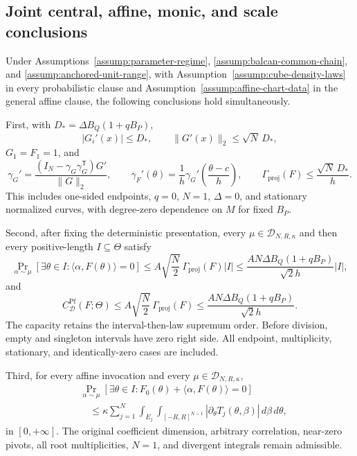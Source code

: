 \subsection{Joint central, affine, monic, and scale conclusions}
\label{app:full-conjunction}

\begin{proposition}
\label{prop:full-conjunction}
Under Assumptions~\ref{assump:parameter-regime},
\ref{assump:balcan-common-chain}, and
\ref{assump:anchored-unit-range}, with
Assumption~\ref{assump:cube-density-laws} in every probabilistic clause and
Assumption~\ref{assump:affine-chart-data} in the general affine clause, the
following conclusions hold simultaneously.

First, with $D_*=\Delta B_Q(1+qB_P)$,
\[
|G_i'(x)|\leq D_*,
\qquad
\|G'(x)\|_2\leq\sqrt N\,D_*,
\]
$G_1=F_1=1$, and
\begin{equation}
\gamma_G'
=\frac{(I_N-\gamma_G\gamma_G^{\mathsf T})G'}{\|G\|_2},
\qquad
\gamma_F'(\theta)
=\frac1h\gamma_G'\!\left(\frac{\theta-c}{h}\right),
\qquad
\Gamma_{\mathrm{proj}}(F)
\leq\frac{\sqrt N\,D_*}{h}.
\label{eq:appendix-79}
\end{equation}
This includes one-sided endpoints, $q=0$, $N=1$, $\Delta=0$, and stationary
normalized curves, with degree-zero dependence on $M$ for fixed $B_P$.

Second, after fixing the deterministic presentation, every
$\mu\in\mathcal D_{N,R,\kappa}$ and then every positive-length
$I\subseteq\Theta$ satisfy
\begin{equation}
\Pr_{\alpha\sim\mu}
[\exists\theta\in I:\langle\alpha,F(\theta)\rangle=0]
\leq A\sqrt{\frac N2}\,\Gamma_{\mathrm{proj}}(F)|I|
\leq\frac{AN\Delta B_Q(1+qB_P)}{\sqrt2 h}|I|,
\label{eq:appendix-80}
\end{equation}
and
\begin{equation}
C^{\mathrm{Pf}}_{\mathcal D}(F;\Theta)
\leq A\sqrt{\frac N2}\,\Gamma_{\mathrm{proj}}(F)
\leq\frac{AN\Delta B_Q(1+qB_P)}{\sqrt2 h}.
\label{eq:appendix-81}
\end{equation}
The capacity retains the interval-then-law supremum order.  Before division,
empty and singleton intervals have zero right side.  All endpoint,
multiplicity, stationary, and identically-zero cases are included.

Third, for every affine invocation and every
$\mu\in\mathcal D_{N,R,\kappa}$,
\begin{equation}
\begin{aligned}
&\Pr_{\alpha\sim\mu}
[\exists\theta\in I:F_0(\theta)+\langle\alpha,F(\theta)\rangle=0]\\
&\quad\leq\kappa\sum_{j=1}^N
\int_{E_j}\int_{[-R,R]^{N-1}}
|\partial_\theta T_j(\theta,\beta)|\,d\beta\,d\theta,
\end{aligned}
\label{eq:appendix-82}
\end{equation}
in $[0,+\infty]$.  The original coefficient dimension, arbitrary
correlation, near-zero pivots, all root multiplicities, $N=1$, and divergent
integrals remain admissible.


\end{proposition}
